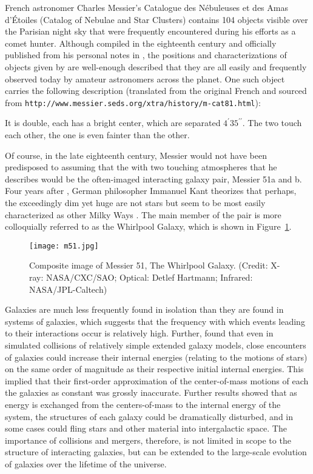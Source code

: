 \sloppy
French astronomer Charles Messier's
Catalogue des N{\'e}buleuses et des Amas d'{\'E}toiles (Catalog of Nebulae and
Star Clusters) contains 104 objects visible over the Parisian night sky that
were frequently encountered during his efforts as a comet hunter.
Although compiled in the
eighteenth century and officially published from his personal notes in
\citeyear{Messier},
the positions and characterizations of objects given by \citet{Messier} are
well-enough described that they are all easily and frequently
observed today by amateur astronomers across the planet. One such object carries the following
description (translated from the original French and sourced from
\texttt{http://www.messier.seds.org/xtra/history/m-cat81.html}):
\begin{displayquote}
    It is double, each has a bright center, which are separated
    $4^{\prime}35^{\prime\prime}$.
    The two  touch each other, the one is even fainter than the
    other. \cite{Messier}
\end{displayquote}
Of course, in the late eighteenth century, Messier would not have been
predisposed to assuming that the  with two touching
atmospheres that he describes would be the often-imaged
interacting galaxy pair, Messier 51a and b.
Four years after \citet{Messier}, German philosopher Immanuel Kant
theorizes that perhaps, the exceedingly dim yet huge  are not
stars but seem to be most easily characterized as other Milky Ways \cite{kant}.
The main member of the pair is more colloquially referred to as the Whirlpool
Galaxy, which is shown in Figure~\ref{fig:m51}.

\begin{figure}[h]
    \centering
    \texttt{[image: m51.jpg]}
    \caption[Composite image of Messier 51]
    {Composite image of Messier 51, The Whirlpool Galaxy. (Credit:
    X-ray: NASA/CXC/SAO; Optical: Detlef Hartmann; Infrared: NASA/JPL-Caltech)}
    \label{fig:m51}
\end{figure}%


Galaxies are much less frequently found in isolation than they are found
in systems of galaxies, which suggests that the frequency with which events
leading to their interactions occur is relatively high.
Further, \citet{Alladin1965} found that even in simulated collisions of
relatively simple extended galaxy models, close encounters of galaxies could
increase their internal energies (relating to the motions of stars)
on the same order of magnitude as their respective initial internal energies.
This implied that their first-order
approximation of the center-of-mass motions of each the galaxies as constant was
grossly inaccurate. Further results showed that as energy
is exchanged from the centers-of-mass to the internal energy of
the system, the structures of each galaxy could be dramatically disturbed, and in
some cases could fling stars and other material into intergalactic space.
The importance of collisions and mergers, therefore, is not
limited in scope to the structure of interacting galaxies, but can be extended
to the large-scale evolution of galaxies over the lifetime of the universe.

